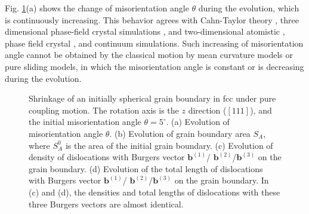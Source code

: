 Fig. \ref{fig:fcctheta0}(a) shows the change of misorientation angle $\theta$ during the evolution, which is continuously  increasing. This behavior agrees with Cahn-Taylor theory \cite{cahn2004unified}, three dimensional phase-field crystal simulations \cite{yamanaka2017phase}, and  two-dimensional atomistic \cite{srinivasan2002challenging,trautt2012grain}, phase field crystal \cite{wu2012phase}, and continuum \cite{zhang2018motion,zhang2019new} simulations. Such increasing  of misorientation angle cannot be obtained by the classical motion by mean curvature models or pure sliding models, in which the misorientation angle is constant or is decreasing during the evolution.



\begin{figure}[htbp]
	\centering
	\caption{Shrinkage of an initially spherical grain boundary in fcc under pure coupling motion. The rotation axis is the $z$ direction ($[111]$), and the initial misorientation angle $\theta=5^\circ$.  (a) Evolution of  misorientation angle $\theta$. (b) Evolution of grain boundary area $S_A$, where $S_A^0$ is the area of the initial grain boundary. (c) Evolution of density of dislocations with Burgers vector $\mathbf b^{(1)}$/ $\mathbf b^{(2)}$/$\mathbf b^{(3)}$ on the grain boundary. (d) Evolution of the total length of dislocations with Burgers vector $\mathbf b^{(1)}$/ $\mathbf b^{(2)}$/$\mathbf b^{(3)}$ on the grain boundary. In (c) and (d), the densities and total lengths of dislocations with these three Burgers vectors are almost identical. }\label{fig:fcctheta0}
\end{figure}	


